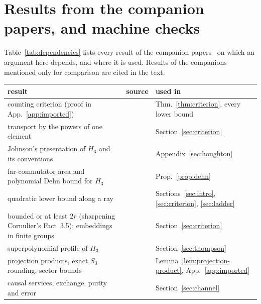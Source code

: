 \clearpage
\section{Results from the companion papers, and machine checks}\label{app:provenance}

Table~\ref{tab:dependencies} lists every result of the companion papers~\cite{DouglasMghirbiA,DouglasMghirbiB} on which an argument here
depends, and where it is used. Results of the companions mentioned only for comparison are cited in the text.

\begin{table}[ht]
\centering\small
\begin{tabular}{@{}>{\raggedright\arraybackslash}p{}>{\raggedright\arraybackslash}p{}>{\raggedright\arraybackslash}p{}@{}}
\toprule
result & source & used in\\
\midrule
counting criterion (proof in App.~\ref{app:imported}) & \cite[Thm.~8.1]{DouglasMghirbiA} & Thm.~\ref{thm:criterion}, every lower bound\\
transport by the powers of one element & \cite[Cor.~8.2]{DouglasMghirbiA} & Section~\ref{sec:criterion}\\
Johnson's presentation of $H_3$ and its conventions & \cite[Section~2]{DouglasMghirbiA} & Appendix~\ref{sec:houghton}\\
far-commutator area and polynomial Dehn bound for $H_3$ & \cite[Thms.~3.2, 3.3]{DouglasMghirbiA} & Prop.~\ref{prop:dehn}\\
quadratic lower bound along a ray & \cite[Prop.~3.4]{DouglasMghirbiA} & Sections~\ref{sec:intro}, \ref{sec:criterion}, \ref{sec:ladder}\\
bounded or at least $2r$ (sharpening Cornulier's Fact~3.5); embeddings in finite groups & \cite[Lemma~2.1]{DouglasMghirbiA} & Section~\ref{sec:criterion}\\
superpolynomial profile of $H_3$ & \cite[Thm.~1.1]{DouglasMghirbiA} & Section~\ref{sec:thompson}\\
projection products, exact $S_3$ rounding, sector bounds & \cite[Section~4]{DouglasMghirbiA} & Lemma~\ref{lem:projection-product}, App.~\ref{app:imported}\\
\midrule
causal services, exchange, purity and error & \cite[Def.~2.3, Section~3]{DouglasMghirbiB} & Section~\ref{sec:channel}\\

\end{tabular}
\end{table}
